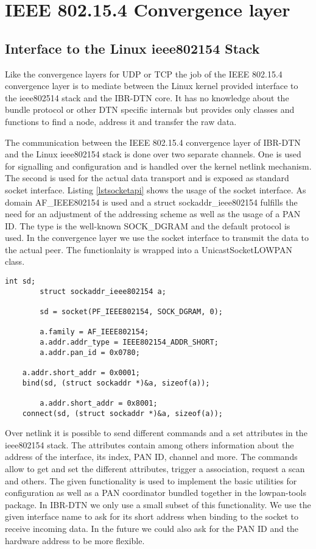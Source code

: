\chapter{IEEE 802.15.4 Convergence layer}
\label{802154layer}
\section{Interface to the Linux ieee802154 Stack}

Like the convergence layers for UDP or TCP the job of the IEEE 802.15.4
convergence layer is to mediate between the Linux kernel provided interface
to the ieee802514 stack and the IBR-DTN core. It has no knowledge about the
bundle protocol or other DTN specific internals but provides only classes and
functions to find a node, address it and transfer the raw data.

The communication between the IEEE 802.15.4 convergence layer of IBR-DTN and the
Linux ieee802154 stack is done over two separate channels. One is used for
signalling and configuration and is handled over the kernel netlink mechanism.
The second is used for the actual data transport and is exposed as standard
socket interface. Listing \ref{lstsocketapi} shows the usage of the socket interface.
As domain AF\_IEEE802154 is used and a struct sockaddr\_ieee802154 fulfills the
need for an adjustment of the addressing scheme as well as the usage of a PAN
ID. The type is the well-known SOCK\_DGRAM and the default protocol is used. In the
convergence layer we use the socket interface to transmit the data to the actual
peer. The functionlaity is wrapped into a UnicastSocketLOWPAN class.

\begin{lstlisting}[caption= ieee802154 socket interface, label=lstsocketapi]
        int sd;
        struct sockaddr_ieee802154 a;

        sd = socket(PF_IEEE802154, SOCK_DGRAM, 0);

        a.family = AF_IEEE802154;
        a.addr.addr_type = IEEE802154_ADDR_SHORT;
        a.addr.pan_id = 0x0780;

	a.addr.short_addr = 0x0001;
	bind(sd, (struct sockaddr *)&a, sizeof(a));

        a.addr.short_addr = 0x8001;
	connect(sd, (struct sockaddr *)&a, sizeof(a));
\end{lstlisting}

Over netlink it is possible to send different commands and a set attributes in the
ieee802154 stack. The attributes contain among others information about the
address of the interface, its index, PAN ID, channel and more. The commands
allow to get and set the different attributes, trigger a association, request a
scan and others. The given functionality is used to implement the basic
utilities for configuration as well as a PAN coordinator bundled together in
the lowpan-tools package. In IBR-DTN we only use a small subset of this
functionality. We use the given interface name to ask for its short address when
binding to the socket to receive incoming data. In the future we could also ask for
the PAN ID and the hardware address to be more flexible.

